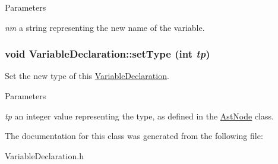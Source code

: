 \begin{DoxyParams}{Parameters}
\item[{\em nm}]a string representing the new name of the variable. \end{DoxyParams}
\hypertarget{classVariableDeclaration_a3fbc1e04d3d8e6aa487ced5215347b51}{
\subsubsection[{setType}]{\setlength{\rightskip}{0pt plus 5cm}void VariableDeclaration::setType (int {\em tp})}}
\label{classVariableDeclaration_a3fbc1e04d3d8e6aa487ced5215347b51}
Set the new type of this \hyperlink{classVariableDeclaration}{VariableDeclaration}.


\begin{DoxyParams}{Parameters}
\item[{\em tp}]an integer value representing the type, as defined in the \hyperlink{classAstNode}{AstNode} class. \end{DoxyParams}


The documentation for this class was generated from the following file:\begin{DoxyCompactItemize}
\item 
VariableDeclaration.h\end{DoxyCompactItemize}
